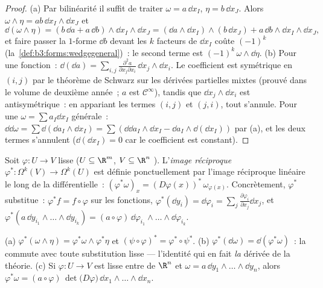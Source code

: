 \begin{proof}
(a) Par bilinéarité il suffit de traiter $\omega = a\,\dd
x_I$, $\eta = b\,\dd x_J$. Alors $\omega \wedge \eta =
ab\,\dd x_I \wedge \dd x_J$ et
\[
\dd(\omega\wedge\eta) = (b\,\dd a + a\,\dd b) \wedge \dd x_I
\wedge \dd x_J
= (\dd a \wedge \dd x_I) \wedge (b\,\dd x_J) +
a\,\dd b \wedge \dd x_I \wedge \dd x_J,
\]
et faire passer la $1$-forme $\dd b$ devant les $k$ facteurs
de $\dd x_I$ coûte $(-1)^k$ (la~\cref{def:b3:forms:wedgegeneral})~:
le second terme est $(-1)^k\,\omega \wedge \dd\eta$.
(b) Pour une fonction~: $\dd(\dd a) = \sum_{i,j}
\frac{\partial^2a}{\partial x_j\partial x_i}\,\dd x_j \wedge
\dd x_i$. Le coefficient est symétrique en $(i,j)$ par le
théorème de Schwarz sur les dérivées partielles mixtes
(prouvé dans le volume de deuxième année~; $a$ est $\mathcal
C^\infty$), tandis que $\dd x_j \wedge \dd x_i$ est
antisymétrique~: en appariant les termes $(i,j)$ et $(j,i)$,
tout s'annule. Pour une $\omega = \sum a_I\dd x_I$
générale~: $\dd\dd\omega = \sum\dd(\dd a_I \wedge \dd x_I)
= \sum(\dd\dd a_I\wedge\dd x_I - \dd a_I\wedge\dd(\dd x_I))$
par (a), et les deux termes s'annulent ($\dd(\dd x_I) = 0$
car le coefficient est constant).
\end{proof}

\begin{definition}\label{def:b3:forms:pullback}
Soit $\varphi\colon U \to V$ lisse ($U \subseteq \R^m$, $V
\subseteq \R^n$ ). L'\emph{image
réciproque} $\varphi^*\colon
\Omega^k(V) \to \Omega^k(U)$ est définie ponctuellement par
l'image réciproque linéaire le long de la différentielle~:
$(\varphi^*\omega)_x = (D\varphi(x))^*\,\omega_{\varphi(x)}$.
Concrètement, $\varphi^*$ substitue~: $\varphi^*f = f \circ
\varphi$ sur les fonctions, $\varphi^*(\dd y_i) =
\dd\varphi_i = \sum_j\frac{\partial\varphi_i}{\partial
x_j}\dd x_j$, et $\varphi^*(a\,\dd y_{i_1}\wedge\dots\wedge
\dd y_{i_k}) =
(a\circ\varphi)\,\dd\varphi_{i_1}\wedge\dots\wedge
\dd\varphi_{i_k}$.
\end{definition}

\begin{theorem}\label{thm:b3:forms:pullback}
(a) $\varphi^*(\omega \wedge \eta) = \varphi^*\omega \wedge
\varphi^*\eta$ et $(\psi \circ \varphi)^* = \varphi^* \circ
\psi^*$.
(b) $\varphi^*(\dd\omega) = \dd(\varphi^*\omega)$~: la
 commute avec toute substitution lisse ---
l'identité qui en fait \emph{la} dérivée de la théorie.
(c) Si $\varphi\colon U \to V$ est lisse entre  de
$\R^n$ et $\omega = a\,\dd y_1 \wedge \dots \wedge \dd
y_n$, alors $\varphi^*\omega = (a \circ
\varphi)\,\det\bigl(D\varphi\bigr)\,\dd x_1 \wedge \dots
\wedge \dd x_n$.
\end{theorem}

